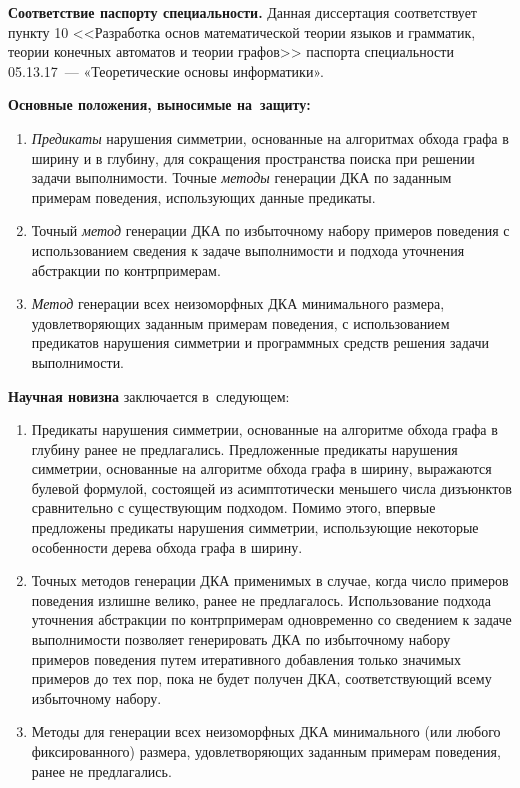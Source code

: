 \textbf{Соответствие паспорту специальности.} Данная диссертация соответствует пункту 10 <<Разработка основ математической теории языков и грамматик, теории конечных автоматов и теории графов>> паспорта специальности 05.13.17~--- «Теоретические основы информатики».

\textbf{Основные положения, выносимые на~защиту:}
\begin{enumerate}
  \item \emph{Предикаты} нарушения симметрии, основанные на алгоритмах обхода графа в ширину и в глубину, для сокращения пространства поиска при решении задачи выполнимости.
  Точные \emph{методы} генерации ДКА по заданным примерам поведения, использующих данные предикаты.
  
  \item Точный \emph{метод} генерации ДКА по избыточному набору примеров поведения с использованием сведения к задаче выполнимости и подхода уточнения абстракции по контрпримерам.

  \item \emph{Метод} генерации всех неизоморфных ДКА минимального размера, удовлетворяющих заданным примерам поведения, с использованием предикатов нарушения симметрии и программных средств решения задачи выполнимости.
\end{enumerate}

\textbf{Научная новизна} заключается в~следующем:
\begin{enumerate}
  \item Предикаты нарушения симметрии, основанные на алгоритме обхода графа в глубину ранее не предлагались.
  Предложенные предикаты нарушения симметрии, основанные на алгоритме обхода графа в ширину, выражаются булевой формулой, состоящей из асимптотически меньшего числа дизъюнктов сравнительно с существующим подходом.
  Помимо этого, впервые предложены предикаты нарушения симметрии, использующие некоторые особенности дерева обхода графа в ширину.

  \item Точных методов генерации ДКА применимых в случае, когда число примеров поведения излишне велико, ранее не предлагалось.
  Использование подхода уточнения абстракции по контрпримерам одновременно со сведением к задаче выполнимости позволяет генерировать ДКА по избыточному набору примеров поведения путем итеративного добавления только значимых примеров до тех пор, пока не будет получен ДКА, соответствующий всему избыточному набору.

  \item Методы для генерации всех неизоморфных ДКА минимального (или любого фиксированного) размера, удовлетворяющих заданным примерам поведения, ранее не предлагались.
\end{enumerate}

